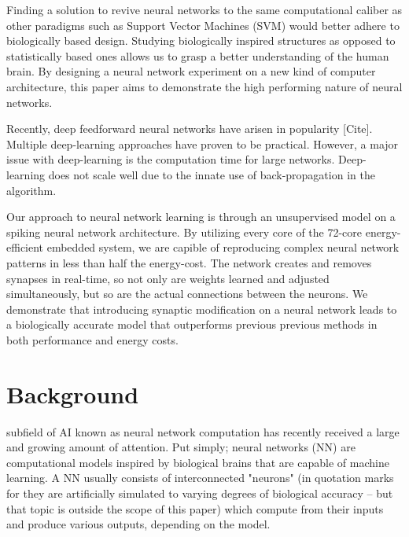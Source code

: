 \documentclass[journal]{./sty/IEEEtran}
\begin{document}
Finding a solution to revive neural networks to the same computational caliber 
as other paradigms such as Support Vector Machines (SVM) would better adhere to biologically based design.
Studying biologically inspired structures as opposed to statistically based ones allows us to grasp a better understanding of the human brain.
By designing a neural network experiment on a new kind of computer architecture, 
this paper aims to demonstrate the high performing nature of neural networks.

Recently, deep feedforward neural networks have arisen in popularity [Cite]. 
Multiple deep-learning approaches have proven to be practical.
However, a major issue with deep-learning is the computation time for large networks.
Deep-learning does not scale well due to the innate use of back-propagation in the algorithm.

Our approach to neural network learning is through an unsupervised model on a spiking neural network architecture.
By utilizing every core of the 72-core energy-efficient embedded system, 
we are capible of reproducing complex neural network patterns in less than half the energy-cost. 
The network creates and removes synapses in real-time, so not only are weights learned and adjusted simultaneously, 
but so are the actual connections between the neurons.
We demonstrate that introducing synaptic modification on a neural network leads to a biologically accurate model
that outperforms previous previous methods in both performance and energy costs.


\section{Background}
 subfield of AI known as neural network computation has recently received a large and growing amount of attention. 
Put simply; neural networks (NN) are computational models inspired by biological brains that are capable of machine learning. 
A NN usually consists of interconnected "neurons" (in quotation marks for they are artificially simulated to varying degrees of biological accuracy -- but that topic is outside the scope of this paper) which compute from their inputs and produce various outputs, depending on the model. 
\end{document}
